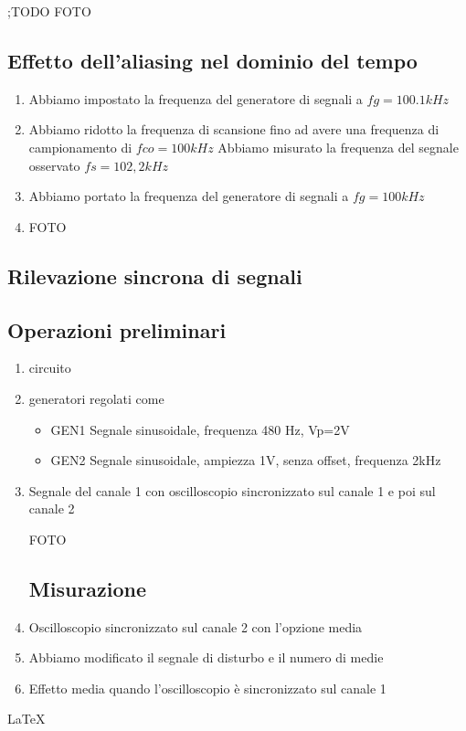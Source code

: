 \documentclass[a4paper]{article}
\begin{document}
;TODO FOTO

\subsection{Effetto dell’aliasing nel dominio del tempo}
 \begin{enumerate}
  \item Abbiamo impostato la frequenza del generatore di segnali a \(fg=100.1 kHz\)
  \item Abbiamo ridotto la frequenza di scansione fino ad avere una frequenza di campionamento di \(fco=100 kHz\) Abbiamo misurato la frequenza del segnale osservato \(fs= 102,2 kHz\)
  \item Abbiamo portato la frequenza del generatore di segnali a \(fg=100kHz\)
  \item FOTO
\end{enumerate}


\begin{tcolorbox}[breakable,colback=cyan,colframe=cyan]
\section*{Rilevazione sincrona di segnali}
\end{tcolorbox}


\subsection{Operazioni preliminari}
 \begin{enumerate}
  \item circuito
  \item generatori regolati come
   \begin{itemize}
     \item GEN1 Segnale sinusoidale, frequenza 480 Hz, Vp=2V
     \item GEN2 Segnale sinusoidale, ampiezza 1V, senza offset, frequenza 2kHz
   \end{itemize}
  \item Segnale del canale 1 con oscilloscopio sincronizzato sul canale 1 e poi sul canale 2

FOTO

\subsection{Misurazione}
  \item Oscilloscopio sincronizzato sul canale 2 con l'opzione media
  \item Abbiamo modificato il segnale di disturbo e il numero di medie
  \item Effetto media quando l'oscilloscopio è sincronizzato sul canale 1
 \end{enumerate}

\noindent \LaTeX
\end{document}

